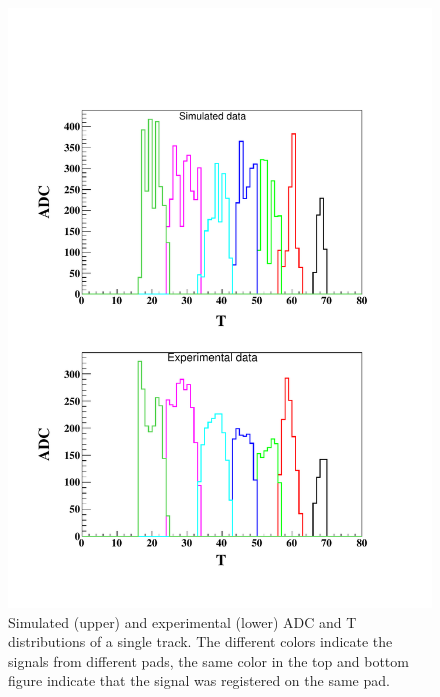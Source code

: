 \documentclass[preprint,5p]{elsarticle}
\begin{document}
\begin{figure}[!t]
   \centering
\includegraphics[scale=0.42]{Event_ADC_Graph_8799283.pdf}
\caption{Simulated (upper) and experimental (lower) ADC and T distributions 
of a single track. The different colors indicate the signals from different pads, 
the same color in the top and bottom figure indicate that the signal was registered
on the same pad.}
\label{fig:EVENT_adc_tdc}
\end{figure}
\end{document}
